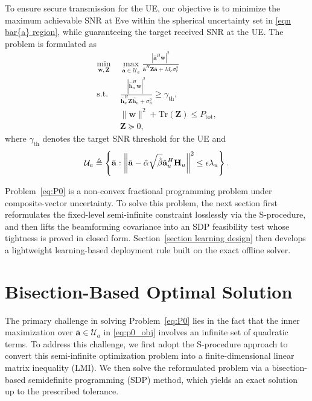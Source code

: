 \documentclass[journal]{IEEEtran}
\begin{document}
To ensure secure transmission for the UE, our objective is to minimize the maximum achievable SNR at Eve within the spherical uncertainty set in \eqref{eqn bar{a} region}, while guaranteeing the target received SNR at the UE. The problem is formulated as
\begin{subequations}\label{eq:P0}
\begin{align}
\min_{\mathbf{w}, \mathbf{Z}} \; & \max_{\bar{\mathbf{a}}\in\mathcal{U}_a} 
\frac{|\bar{\mathbf{a}}^H \mathbf{w}|^2}{\bar{\mathbf{a}}^H \mathbf{Z} \bar{\mathbf{a}} + M_e \sigma_e^2} \label{eq:p0_obj}\\ 
\mathrm{s.t.} \; 
& \frac{|\hat{\mathbf{h}}_u^H \mathbf{w}|^2}{\hat{\mathbf{h}}_u^H \mathbf{Z} \hat{\mathbf{h}}_u + \sigma_u^2} \geq \gamma_{\mathrm{th}}, \label{eq:p0_qos}\\
& \|\mathbf{w}\|^2 + \mathrm{Tr}(\mathbf{Z}) \leq P_{\mathrm{tot}}, \label{eq:p0_power}\\
& \mathbf{Z} \succeq 0, \label{eq:SD}
\end{align}
\end{subequations}
where $\gamma_{\mathrm{th}}$ denotes the target SNR threshold for the UE and 
\begin{align}
\mathcal{U}_a \triangleq \left\{\bar{\mathbf{a}} : \left\|\bar{\mathbf{a}} - \hat{\alpha}\sqrt{\hat{\beta}}\hat{\mathbf{a}}_u^H \mathbf{H}_u \right\|^2 \leq \epsilon\lambda_u\right\}.\notag
\end{align}

Problem~\eqref{eq:P0} is a non-convex fractional programming problem under composite-vector uncertainty. To solve this problem, the next section first reformulates the fixed-level semi-infinite constraint losslessly via the S-procedure, and then lifts the beamforming covariance into an SDP feasibility test whose tightness is proved in closed form. Section~\ref{section learning design} then develops a lightweight learning-based deployment rule built on the exact offline solver.


\section{Bisection-Based Optimal Solution}\label{section Exact SDP Solver}
The primary challenge in solving Problem~\eqref{eq:P0} lies in the fact that the inner maximization over $\bar{\mathbf{a}} \in \mathcal{U}_a$ in \eqref{eq:p0_obj} involves an infinite set of quadratic terms. To address this challenge, we first adopt the S-procedure approach to convert this semi-infinite optimization problem into a finite-dimensional linear matrix inequality (LMI). We then solve the reformulated problem via a bisection-based semidefinite programming (SDP) method, which yields an exact solution up to the prescribed tolerance.
\end{document}
